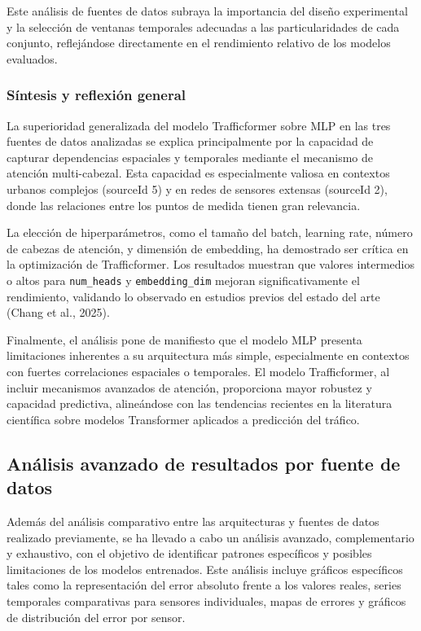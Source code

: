 Este análisis de fuentes de datos subraya la importancia del diseño experimental y la selección de ventanas temporales adecuadas a las particularidades de cada conjunto, reflejándose directamente en el rendimiento relativo de los modelos evaluados.

\subsubsection*{Síntesis y reflexión general}

La superioridad generalizada del modelo Trafficformer sobre MLP en las tres fuentes de datos analizadas se explica principalmente por la capacidad de capturar dependencias espaciales y temporales mediante el mecanismo de atención multi-cabezal. Esta capacidad es especialmente valiosa en contextos urbanos complejos (sourceId 5) y en redes de sensores extensas (sourceId 2), donde las relaciones entre los puntos de medida tienen gran relevancia.

La elección de hiperparámetros, como el tamaño del batch, learning rate, número de cabezas de atención, y dimensión de embedding, ha demostrado ser crítica en la optimización de Trafficformer. Los resultados muestran que valores intermedios o altos para \texttt{num\_heads} y \texttt{embedding\_dim} mejoran significativamente el rendimiento, validando lo observado en estudios previos del estado del arte (Chang et al., 2025).

Finalmente, el análisis pone de manifiesto que el modelo MLP presenta limitaciones inherentes a su arquitectura más simple, especialmente en contextos con fuertes correlaciones espaciales o temporales. El modelo Trafficformer, al incluir mecanismos avanzados de atención, proporciona mayor robustez y capacidad predictiva, alineándose con las tendencias recientes en la literatura científica sobre modelos Transformer aplicados a predicción del tráfico.

\subsection{Análisis avanzado de resultados por fuente de datos}
\label{sec:analisis_avanzado_resultados}

Además del análisis comparativo entre las arquitecturas y fuentes de datos realizado previamente, se ha llevado a cabo un análisis avanzado, complementario y exhaustivo, con el objetivo de identificar patrones específicos y posibles limitaciones de los modelos entrenados. Este análisis incluye gráficos específicos tales como la representación del error absoluto frente a los valores reales, series temporales comparativas para sensores individuales, mapas de errores y gráficos de distribución del error por sensor.

